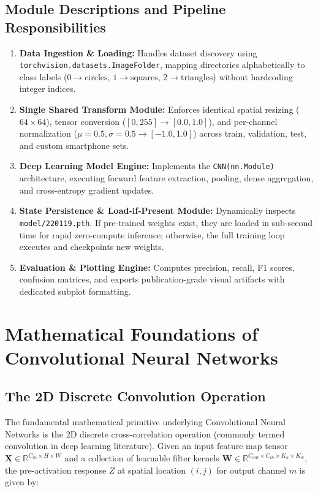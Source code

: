 \documentclass[11pt,a4paper,oneside]{report}
\begin{document}
\section{Module Descriptions and Pipeline Responsibilities}
\begin{enumerate}[leftmargin=*]
    \item \textbf{Data Ingestion \& Loading:} Handles dataset discovery using \texttt{torchvision.datasets.ImageFolder}, mapping directories alphabetically to class labels ($0\to \text{circles}$, $1\to \text{squares}$, $2\to \text{triangles}$) without hardcoding integer indices.
    \item \textbf{Single Shared Transform Module:} Enforces identical spatial resizing ($64\times 64$), tensor conversion ($[0, 255] \to [0.0, 1.0]$), and per-channel normalization ($\mu=0.5, \sigma=0.5 \to [-1.0, 1.0]$) across train, validation, test, and custom smartphone sets.
    \item \textbf{Deep Learning Model Engine:} Implements the \texttt{CNN(nn.Module)} architecture, executing forward feature extraction, pooling, dense aggregation, and cross-entropy gradient updates.
    \item \textbf{State Persistence \& Load-if-Present Module:} Dynamically inspects \texttt{model/220119.pth}. If pre-trained weights exist, they are loaded in sub-second time for rapid zero-compute inference; otherwise, the full training loop executes and checkpoints new weights.
    \item \textbf{Evaluation \& Plotting Engine:} Computes precision, recall, F1 scores, confusion matrices, and exports publication-grade visual artifacts with dedicated subplot formatting.
\end{enumerate}

\chapter{Mathematical Foundations of Convolutional Neural Networks}

\section{The 2D Discrete Convolution Operation}
The fundamental mathematical primitive underlying Convolutional Neural Networks is the 2D discrete cross-correlation operation (commonly termed convolution in deep learning literature). Given an input feature map tensor $\mathbf{X} \in \mathbb{R}^{C_{in} \times H \times W}$ and a collection of learnable filter kernels $\mathbf{W} \in \mathbb{R}^{C_{out} \times C_{in} \times K_h \times K_w}$, the pre-activation response $Z$ at spatial location $(i, j)$ for output channel $m$ is given by:
\end{document}
